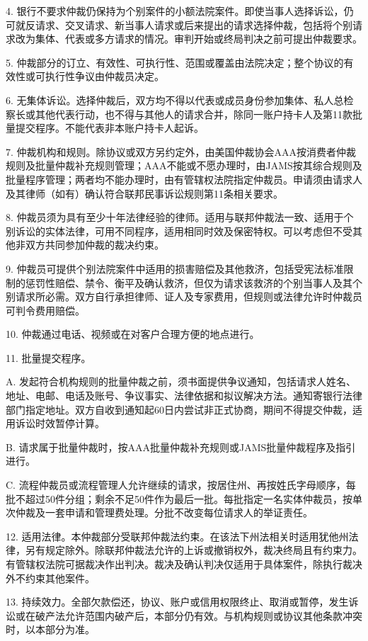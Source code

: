 \documentclass[UTF8,fontset=none,11pt,a4paper]{ctexart}
\begin{document}
4. 银行不要求仲裁仍保持为个别案件的小额法院案件。即使当事人选择诉讼，仍可就反请求、交叉请求、新当事人请求或后来提出的请求选择仲裁，包括将个别请求改为集体、代表或多方请求的情况。审判开始或终局判决之前可提出仲裁要求。


5. 仲裁部分的订立、有效性、可执行性、范围或覆盖由法院决定；整个协议的有效性或可执行性争议由仲裁员决定。


6. 无集体诉讼。选择仲裁后，双方均不得以代表或成员身份参加集体、私人总检察长或其他代表行动，也不得与其他人的请求合并，除同一账户持卡人及第11款批量提交程序。不能代表非本账户持卡人起诉。


7. 仲裁机构和规则。除协议或双方另约定外，由美国仲裁协会AAA按消费者仲裁规则及批量仲裁补充规则管理；AAA不能或不愿办理时，由JAMS按其综合规则及批量程序管理；两者均不能办理时，由有管辖权法院指定仲裁员。申请须由请求人及其律师（如有）确认符合联邦民事诉讼规则第11条相关要求。


8. 仲裁员须为具有至少十年法律经验的律师。适用与联邦仲裁法一致、适用于个别诉讼的实体法律，可用不同程序，适用相同时效及保密特权。可以考虑但不受其他非双方共同参加仲裁的裁决约束。


9. 仲裁员可提供个别法院案件中适用的损害赔偿及其他救济，包括受宪法标准限制的惩罚性赔偿、禁令、衡平及确认救济，但仅为请求该救济的个别当事人及其个别请求所必需。双方自行承担律师、证人及专家费用，但规则或法律允许时仲裁员可判令费用赔偿。


10. 仲裁通过电话、视频或在对客户合理方便的地点进行。


11. 批量提交程序。


A. 发起符合机构规则的批量仲裁之前，须书面提供争议通知，包括请求人姓名、地址、电邮、电话及账号、争议事实、法律依据和拟议解决方法。通知寄银行法律部门指定地址。双方自收到通知起60日内尝试非正式协商，期间不得提交仲裁，适用诉讼时效暂停计算。


B. 请求属于批量仲裁时，按AAA批量仲裁补充规则或JAMS批量仲裁程序及指引进行。


C. 流程仲裁员或流程管理人允许继续的请求，按居住州、再按姓氏字母顺序，每批不超过50件分组；剩余不足50件作为最后一批。每批指定一名实体仲裁员，按单次仲裁及一套申请和管理费处理。分批不改变每位请求人的举证责任。


12. 适用法律。本仲裁部分受联邦仲裁法约束。在该法下州法相关时适用犹他州法律，另有规定除外。除联邦仲裁法允许的上诉或撤销权外，裁决终局且有约束力。有管辖权法院可据裁决作出判决。裁决及确认判决仅适用于具体案件，除执行裁决外不约束其他案件。


13. 持续效力。全部欠款偿还，协议、账户或信用权限终止、取消或暂停，发生诉讼或在破产法允许范围内破产后，本部分仍有效。与机构规则或协议其他条款冲突时，以本部分为准。
\end{document}
